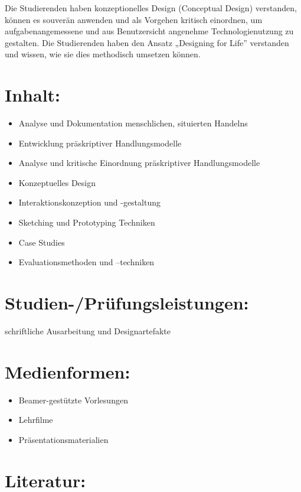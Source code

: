 Die Studierenden haben konzeptionelles Design (Conceptual Design)
verstanden, können es souverän anwenden und als Vorgehen kritisch
einordnen, um aufgabenangemessene und aus Benutzersicht angenehme
Technologienutzung zu gestalten. Die Studierenden haben den Ansatz
„Designing for Life'' verstanden und wissen, wie sie dies methodisch
umsetzen können.

\section*{Inhalt:}\label{inhalt-5}

\begin{itemize}
\item
  Analyse und Dokumentation menschlichen, situierten Handelns
\item
  Entwicklung präskriptiver Handlungsmodelle
\item
  Analyse und kritische Einordnung präskriptiver Handlungsmodelle
\item
  Konzeptuelles Design
\item
  Interaktionskonzeption und -gestaltung
\item
  Sketching und Prototyping Techniken
\item
  Case Studies
\item
  Evaluationsmethoden und --techniken
\end{itemize}

\section*{Studien-/Prüfungsleistungen:}\label{studien-pruxfcfungsleistungen-5}

schriftliche Ausarbeitung und Designartefakte

\section*{Medienformen:}\label{medienformen-5}

\begin{itemize}
\item
  Beamer-gestützte Vorlesungen
\item
  Lehrfilme
\item
  Präsentationsmaterialien
\end{itemize}

\section*{Literatur:}\label{literatur-5}

